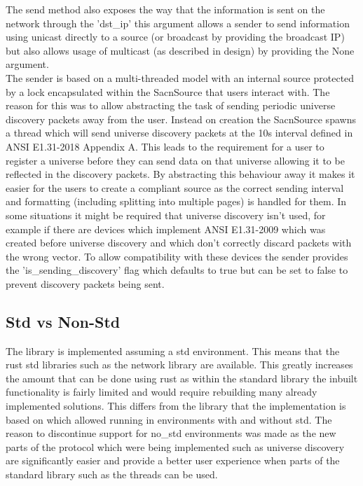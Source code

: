 \documentclass[11pt,a4paper]{report}
\begin{document}
The send method also exposes the way that the information is sent on the network through the 'dst\_ip' this argument allows a sender to send information using unicast directly to a source (or broadcast by providing the broadcast IP) but also allows usage of multicast (as described in design) by providing the None argument. \\

The sender is based on a multi-threaded model with an internal source protected by a lock encapsulated within the SacnSource that users interact with. The reason for this was to allow abstracting the task of sending periodic universe discovery packets away from the user. Instead on creation the SacnSource spawns a thread which will send universe discovery packets at the 10s interval defined in ANSI E1.31-2018 Appendix A. This leads to the requirement for a user to register a universe before they can send data on that universe allowing it to be reflected in the discovery packets. By abstracting this behaviour away it makes it easier for the users to create a compliant source as the correct sending interval and formatting (including splitting into multiple pages) is handled for them. In some situations it might be required that universe discovery isn't used, for example if there are devices which implement ANSI E1.31-2009 which was created before universe discovery and which don't correctly discard packets with the wrong vector. To allow compatibility with these devices the sender provides the 'is\_sending\_discovery' flag which defaults to true but can be set to false to prevent discovery packets being sent.

\subsection{Std vs Non-Std}
The library is implemented assuming a std environment. This means that the rust std libraries such as the network library are available. This greatly increases the amount that can be done using rust as within the standard library the inbuilt functionality is fairly limited and would require rebuilding many already implemented solutions. This differs from the library that the implementation is based on which allowed running in environments with and without std. The reason to discontinue support for no\_std environments was made as the new parts of the protocol which were being implemented such as universe discovery are significantly easier and provide a better user experience when parts of the standard library such as the threads can be used. \\
\end{document}
